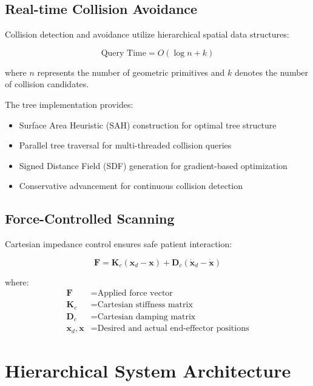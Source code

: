 \subsection{Real-time Collision Avoidance}

Collision detection and avoidance utilize hierarchical spatial data structures:

\begin{equation}
    \text{Query Time} = O(\log n + k)
\end{equation}

where $n$ represents the number of geometric primitives and $k$ denotes the number of collision candidates.

The \bvh{} tree implementation provides:
\begin{itemize}
    \item Surface Area Heuristic (SAH) construction for optimal tree structure
    \item Parallel tree traversal for multi-threaded collision queries
    \item Signed Distance Field (SDF) generation for gradient-based optimization
    \item Conservative advancement for continuous collision detection
\end{itemize}

\subsection{Force-Controlled Scanning}

Cartesian impedance control ensures safe patient interaction:

\begin{equation}
    \bm{F} = \bm{K}_c(\bm{x}_d - \bm{x}) + \bm{D}_c(\dot{\bm{x}}_d - \dot{\bm{x}})
\end{equation}

where:
\begin{align}
    \bm{F} &= \text{Applied force vector} \\
    \bm{K}_c &= \text{Cartesian stiffness matrix} \\
    \bm{D}_c &= \text{Cartesian damping matrix} \\
    \bm{x}_d, \bm{x} &= \text{Desired and actual end-effector positions}
\end{align}

\section{Hierarchical System Architecture}
\label{sec:hierarchical_architecture}

